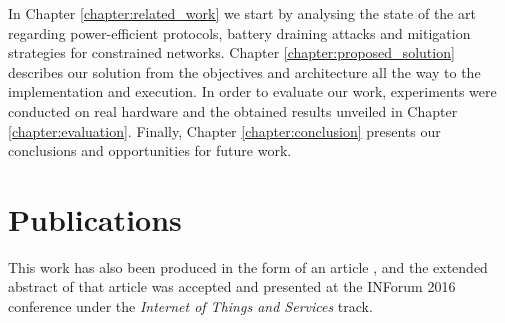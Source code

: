 In Chapter \ref{chapter:related_work} we start by analysing the state of the art regarding power-efficient protocols, battery draining attacks and mitigation strategies for constrained networks. Chapter \ref{chapter:proposed_solution} describes our solution from the objectives and architecture all the way to the implementation and execution. In order to evaluate our work, experiments were conducted on real hardware and the obtained results unveiled in Chapter \ref{chapter:evaluation}. Finally, Chapter \ref{chapter:conclusion} presents our conclusions and opportunities for future work. 

\section{Publications} 
	
This work has also been produced in the form of an article \cite{Diogo2016}, and the extended abstract of that article was accepted and presented at the INForum 2016 conference under the \emph{Internet of Things and Services} track.
